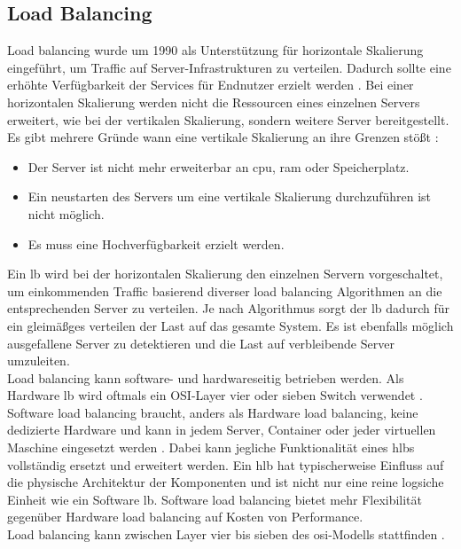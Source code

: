 \subsection{Load Balancing} \label{s:load-balancing}
Load balancing wurde um 1990 als Unterstützung für horizontale Skalierung eingeführt, um Traffic auf Server-Infrastrukturen zu verteilen. Dadurch sollte eine erhöhte Verfügbarkeit der Services für Endnutzer erzielt werden \cite{LoadBalancing101}.
Bei einer horizontalen Skalierung werden nicht die Ressourcen eines einzelnen Servers erweitert, wie bei der vertikalen Skalierung, sondern weitere Server bereitgestellt. Es gibt mehrere Gründe wann eine vertikale Skalierung an ihre Grenzen stö{\ss}t \cite{bourkeServerLoadBalancing2001}:
\begin{itemize}
    \item Der Server ist nicht mehr erweiterbar an \acs{cpu}, \acs{ram} oder Speicherplatz.
    \item Ein neustarten des Servers um eine vertikale Skalierung durchzuführen ist nicht möglich.
    \item Es muss eine Hochverfügbarkeit erzielt werden.
\end{itemize}
Ein \acl{lb} wird bei der horizontalen Skalierung den einzelnen Servern vorgeschaltet, um einkommenden Traffic basierend diverser load balancing Algorithmen an die entsprechenden Server zu verteilen.
Je nach Algorithmus sorgt der \ac{lb} dadurch für ein gleimä{\ss}ges verteilen der Last auf das gesamte System. Es ist ebenfalls möglich ausgefallene Server zu detektieren und die Last auf verbleibende Server umzuleiten.
\cite{LoadBalancing101}
\\
Load balancing kann software- und hardwareseitig betrieben werden. Als Hardware \ac{lb} wird oftmals ein OSI-Layer vier oder sieben Switch verwendet \cite{WasIstLoad2016}.
Software load balancing braucht, anders als Hardware load balancing, keine dedizierte Hardware und kann in jedem Server, Container oder jeder virtuellen Maschine eingesetzt werden \cite{SoftwareLoadBalancing}.
Dabei kann jegliche Funktionalität eines \acp{hlb} vollständig ersetzt und erweitert werden.
Ein \ac{hlb} hat typischerweise Einfluss auf die physische Architektur der Komponenten und ist nicht nur eine reine logsiche Einheit wie ein Software \ac{lb}.
Software load balancing bietet mehr Flexibilität gegenüber Hardware load balancing auf Kosten von Performance.
\cite{WhatLoadBalancer}
\\
Load balancing kann zwischen Layer vier bis sieben des \ac{osi}-Modells stattfinden \cite{WhatLoadBalancer}.
